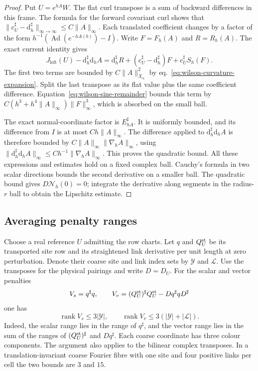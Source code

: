 \documentclass[11pt,letterpaper,reqno]{amsart}
\numberwithin{equation}{section}
\renewcommand{\eqref}[1]{\textup{eq.~\ref{#1}}}
\theoremstyle{definition}
\theoremstyle{remark}
\begin{document}
\begin{proof}
Put \(U=e^{hA}W\). The flat curl transpose is a sum of backward differences in this
frame. The formula for the forward covariant curl shows that
\(\|\mathrm c_U^\sharp-\mathrm d_h^\sharp\|_{\infty\to\infty}
\le C\|A\|_\infty\). Each translated coefficient changes by a
factor of the form \(h^{-1}(\operatorname{Ad}(e^{-hA(b)})-I)\).
Write \(F=F_h(A)\) and \(R=R_h(A)\). The exact current identity gives
\[
 J_{\mathrm{left}}(U)-\mathrm d_h^\sharp\mathrm d_h A
   =\mathrm d_h^\sharp R
      +(\mathrm c_U^\sharp-\mathrm d_h^\sharp)F
      +\mathrm c_U^\sharp S_h(F).
\]
The first two terms are bounded by \(C\|A\|_{X_\alpha}^2\) by
\eqref{eq:wilson-curvature-expansion}. Split the last transpose
as its flat value plus the same coefficient difference.
Equation~\ref{eq:wilson-sine-remainder} bounds this term by
\(C(h^3+h^4\|A\|_\infty)\|F\|_\infty^3\), which is absorbed on
the small ball.

The exact normal-coordinate factor is \(E_{hA}^\sharp\).
It is uniformly bounded, and its difference from \(I\) is at
most \(Ch\|A\|_\infty\). The difference applied to
\(\mathrm d_h^\sharp\mathrm d_h A\) is therefore bounded by
\(C\|A\|_\infty\|\nabla_h A\|_\infty\), using
\(\|\mathrm d_h^\sharp\mathrm d_h A\|_\infty
\le Ch^{-1}\|\nabla_h A\|_\infty\). This proves the quadratic
bound. All these expressions and estimates hold on a fixed
complex ball. Cauchy's formula in two scalar directions bounds
the second derivative on a smaller ball. The quadratic bound
gives \(D\mathcal N_h(0)=0\); integrate the derivative along
segments in the radius-\(r\) ball to obtain the Lipschitz estimate.
\end{proof}

\subsection{Averaging penalty ranges}

Choose a real reference \(U\) admitting the row charts. Let \(q\)
and \(Q_U^{\rm st}\) be its transported site row and its straightened link
derivative per unit length at zero perturbation. Denote their
coarse site and link index sets by \(\mathcal Y\) and \(\mathcal L\).
Use the transposes for the physical pairings and write \(D=D_U\).
For the scalar and vector penalties
\[
               V_s=q^\sharp q,\qquad
               V_v=(Q_U^{\rm st})^\sharp Q_U^{\rm st}-Dq^\sharp qD^\sharp
\]
one has
\begin{equation}\label{eq:wilson-penalty-rank}
 \operatorname{rank} V_s\leq 3|\mathcal Y|,\qquad
 \operatorname{rank} V_v\leq 3(|\mathcal Y|+|\mathcal L|).
\end{equation}
Indeed, the scalar range lies in the range of \(q^\sharp\), and
the vector range lies in the sum of the ranges of \((Q_U^{\rm st})^\sharp\)
and \(Dq^\sharp\). Each coarse coordinate has three colour
components. The argument also applies to the bilinear complex
transposes. In a translation-invariant coarse Fourier fibre with
one site and four positive links per cell the two bounds are \(3\)
and \(15\).
\end{document}
